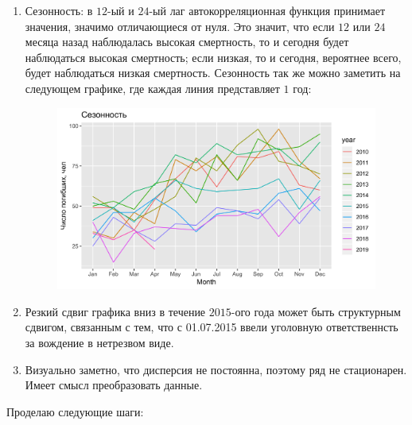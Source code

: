 \documentclass[14pt, a4paper]{extarticle}\usepackage[]{graphicx}\usepackage[]{color}
\makeatletter
\def\maxwidth{ %
  \ifdim\Gin@nat@width>\linewidth
    \linewidth
  \else
    \Gin@nat@width
  \fi
}
\newenvironment{knitrout}{}{} %
\makeatother
\begin{document}
\begin{enumerate}

\item Сезонность: в $12$-ый и $24$-ый лаг автокорреляционная функция принимает значения, значимо отличающиеся от нуля. Это значит, что если $12$ или $24$ месяца назад наблюдалась высокая смертность, то и сегодня будет наблюдаться высокая смертность; если низкая, то и сегодня, вероятнее всего, будет наблюдаться низкая смертность. Сезонность так же можно заметить на следующем графике, где каждая линия представляет $1$ год:

\begin{figure} [H]
\begin{knitrout}
\color{fgcolor}

{\centering \includegraphics[width=\maxwidth]{figure/unnamed-chunk-2-1} 

}



\end{knitrout}
\end{figure}

\item Резкий сдвиг графика вниз в течение $2015$-ого года может быть структурным сдвигом, связанным с тем, что с 01.07.2015 ввели уголовную ответственнсть за вождение в нетрезвом виде. 

\item Визуально заметно, что дисперсия не постоянна, поэтому ряд не стационарен. Имеет смысл преобразовать данные. 

\end{enumerate}



Проделаю следующие шаги:
\end{document}
